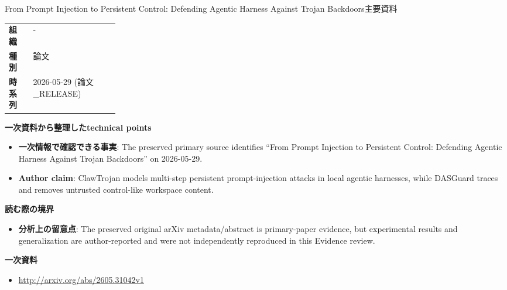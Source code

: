 \begin{technicalnote}{From Prompt Injection to Persistent Control: Defending Agentic Harness Against Trojan Backdoors}{主要資料}
\begin{tabularx}{\linewidth}{@{}>{\bfseries}p{0.22\linewidth}X@{}}
組織 & - \\
種別 & 論文 \\
時系列 & 2026-05-29 (論文\_RELEASE) \\
\end{tabularx}
\smallskip
{\bfseries 一次資料から整理したtechnical points}
\begin{itemize}[leftmargin=1.5em,itemsep=0.35em]
\item \textbf{一次情報で確認できる事実}: The preserved primary source identifies “From Prompt Injection to Persistent Control: Defending Agentic Harness Against Trojan Backdoors” on 2026-05-29.
\item \textbf{Author claim}: ClawTrojan models multi-step persistent prompt-injection attacks in local agentic harnesses, while DASGuard traces and removes untrusted control-like workspace content.
\end{itemize}
{\bfseries 読む際の境界}
\begin{itemize}[leftmargin=1.5em,itemsep=0.35em]
\item \textbf{分析上の留意点}: The preserved original arXiv metadata/abstract is primary-paper evidence, but experimental results and generalization are author-reported and were not independently reproduced in this Evidence review.
\end{itemize}
{\bfseries 一次資料}
\begingroup\sloppy
\begin{itemize}[leftmargin=1.5em,itemsep=0.25em]
\item {\scriptsize\url{http://arxiv.org/abs/2605.31042v1}}
\end{itemize}
\endgroup
\end{technicalnote}
\medskip


